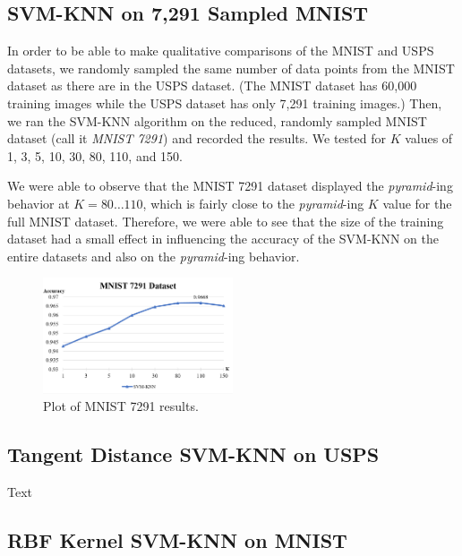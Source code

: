 \documentclass[11pt,letterpaper]{article}
\begin{document}
\subsection{SVM-KNN on 7,291 Sampled MNIST}

In order to be able to make qualitative comparisons of the MNIST and USPS datasets, we randomly sampled the same number of data points from the MNIST dataset as there are in the USPS dataset. (The MNIST dataset has 60,000 training images while the USPS dataset has only 7,291 training images.) Then, we ran the SVM-KNN algorithm on the reduced, randomly sampled MNIST dataset (call it \textit{MNIST 7291}) and recorded the results. We tested for $K$ values of 1, 3, 5, 10, 30, 80, 110, and 150.

We were able to observe that the MNIST 7291 dataset displayed the \textit{pyramid}-ing behavior at $K=80\dots 110$, which is fairly close to the \textit{pyramid}-ing $K$ value for the full MNIST dataset. Therefore, we were able to see that the size of the training dataset had a small effect in influencing the accuracy of the SVM-KNN on the entire datasets and also on the \textit{pyramid}-ing behavior.

\begin{figure}[t!]
  \centering
  \includegraphics[keepaspectratio, width=0.5\textwidth]{mnist_7291.png}
  \caption{Plot of MNIST 7291 results.}
\end{figure}

\subsection{Tangent Distance SVM-KNN on USPS}

Text


\subsection{RBF Kernel SVM-KNN on MNIST}
\end{document}
